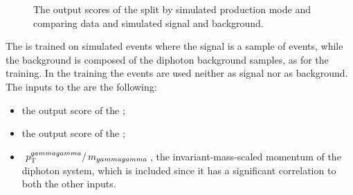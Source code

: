 \begin{figure}[h]
\centering
\caption{The output scores of the \DiJetBdt split by simulated production mode and comparing data and simulated signal and background.}
\label{fig:cat:dijet_bdt}
\end{figure}

The \DiPhoDiJetBdt is trained on simulated events where the signal is a sample of \VBF \Hgg events, while the background is composed of the \SM diphoton background samples, as for the \DiJetBdt training. In the training the \ggH events are used neither as signal nor as background. The inputs to the \BDT are the following:
\begin{itemize}
\item the output score of the \DiPhoBdt;
\item the output score of the \DiJetBdt;
\item $\,p_\text{T}^{gammagamma}/\,m_{gammagamma}$, the invariant-mass-scaled momentum of the diphoton system, which is included since it has a significant correlation to both the other inputs.
\end{itemize}


